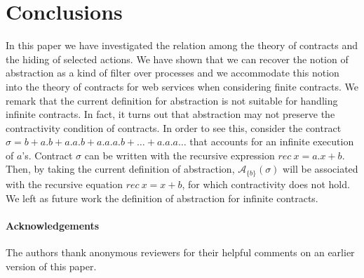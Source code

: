 \documentclass[submission,copyright,creativecommons]{eptcs}
\begin{document}
\section{Conclusions}
In this paper we have investigated the relation among the theory of contracts and the hiding of selected actions.  We have shown that we can recover the notion of abstraction as a kind of filter over processes and we accommodate this notion into the theory of contracts for web services when considering finite contracts. We remark that the current definition for abstraction is not suitable for handling infinite contracts. In fact, it turns out that abstraction may not preserve the contractivity condition of contracts. In order to see this, consider the contract $\sigma = b+ a.b + a.a.b + a.a.a.b + \ldots+ a.a.a\ldots $ that accounts for an infinite execution of  $a$'s. Contract $\sigma$ can be written with the recursive expression $\mathit{rec}\  x = a. x + b$. Then, by taking the current definition of abstraction, $\mathcal{A}_{\{b\}} (\sigma)$ will be associated with the recursive equation $\mathit{rec}\  x = x+b$, for which contractivity does not hold.  We left as future work the definition of abstraction for infinite contracts. 

\paragraph{Acknowledgements} The authors thank
anonymous reviewers for their helpful comments on an earlier version of this paper.
\end{document}
